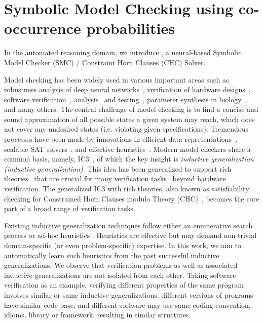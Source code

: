 \section{Symbolic Model Checking using co-occurrence probabilities}
In the automated reasoning domain, we introduce \dpy, a neural-based Symbolic Model Checker (SMC) / Constraint Horn Clauses (CHC) Solver.

Model checking has been widely used in various important areas such as robustness analysis of deep neural networks~\cite{Katz:cav19}, verification of hardware designs~\cite{SMC96}, software verification~\cite{Ball02}, analysis~\cite{ESC-java-02} and testing~\cite{Sheyner:SP02}, parameter synthesis in biology~\cite{Barnat:biology12}, and many others. 
The central challenge of model checking is to find a concise and sound approximation of all possible states a given system may reach, which does not cover any undesired states (i.e. violating given specifications). 
Tremendous processes have been made by innovations in efficient data representations~\cite{BDD}, scalable SAT solvers~\cite{CDCL,chaff,minisat}, and effective heuristics~\cite{CEGAR,BMC,McMillan:cav06}.  
Modern model checkers share a common basis, namely, IC3~\cite{IC3}, of which the key insight is \textit{inductive generalization (inductive generalization)}.
This idea has been generalized to support rich theories~\cite{GPDR} that are crucial for many verification tasks~\cite{Komuravelli:cav13,SeaHorn} beyond hardware verification. 
The generalized IC3 with rich theories, also known as satisfiability checking for Constrained Horn Clauses modulo Theory
(CHC)~\cite{DBLP:conf/birthday/BjornerGMR15}, becomes the core part of a broad range of verification tasks.



Existing inductive generalization techniques follow either an enumerative search process \cite{IC3,Bradley:fmcad11} or ad-hoc heuristics \cite{Griggio:CAD16,GSpacer}. 
Heuristics are effective but may demand non-trivial domain-specific (or even problem-specific) expertise. 
In this work, we aim to automatically learn such heuristics from the past successful inductive generalizations. 
We observe that verification problems as well as associated inductive generalizations are not isolated from each other. 
Taking software verification as an example, verifying different properties of the same program involves similar or same inductive generalizations; different versions of programs have similar code base; and
different software may use same coding convention, idioms, library or framework, resulting in similar structures.

